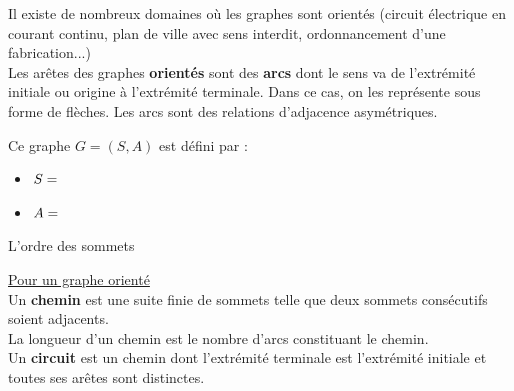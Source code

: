 Il existe de nombreux domaines où les graphes sont orientés (circuit électrique en courant continu, plan de ville avec sens interdit, ordonnancement d'une fabrication...)\\
Les arêtes des graphes \textbf{orientés} sont des \textbf{arcs} dont le sens va de l'extrémité initiale ou origine à l'extrémité terminale. Dans ce cas, on les représente sous forme de flèches. Les arcs sont des relations d'adjacence asymétriques.

\vspace{0.3cm}

\begin{minipage}[l]{0.5\linewidth}
\begin{center}
\end{center}
\end{minipage}
\begin{minipage}[l]{0.5\linewidth}
Ce graphe $G=(S,A)$ est défini par :
\begin{itemize}
\item $S=\Cache{\{0,1,2,3,4\}}$
\item $A=\Cache{\{(0,1),(0,3),(4,2),(3,4),(2,3),(2,0)\}}$
\end{itemize}
L'ordre des sommets
\end{minipage}
\newpage

\begin{defi}
\underline{Pour un graphe orienté}\\
Un \textbf{chemin} est une suite finie de sommets telle que deux sommets consécutifs soient adjacents.\\
La longueur d'un chemin est le nombre d'arcs constituant le chemin.\\
Un \textbf{circuit} est un chemin dont l'extrémité terminale est l'extrémité initiale et toutes ses arêtes sont distinctes.
\end{defi}

